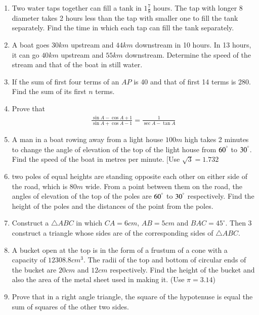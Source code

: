 \documentclass[12pt,-letter paper]{article}
\begin{document}
\begin{enumerate}
\item Two water taps together can fill a tank in $1\frac{7}{8}$
hours. The tap with longer 8 diameter takes 2 hours less than the tap with smaller one to fill the tank separately. Find the time in which each tap can fill the tank separately.
\item A boat goes $30 km$ upstream and $44 km$ downstream in 10 hours. In 13 hours, it can go $40 km$ upstream and $55 km$ downstream. Determine the speed of the stream and that of the boat in still water.
\item If the sum of first four terms of an $AP$ is 40 and that of first 14 terms is 280. Find the sum of its first $n$ terms.
\item Prove that \begin{align*} \frac{\sin A-\cos A+1}{\sin A+ \cos A-1}  =\frac{1}{\sec A-\tan A}\end{align*}
\item A man in a boat rowing away from a light house $100 m$ high takes 2 minutes to change the angle of elevation of the top of the light house from $60^\degree$ to $30^\degree$. Find the speed of the boat in metres per minute. [Use $\sqrt{3}=1.732$
\item two poles of equal heights are standing opposite each other on either side of the road, which is $80 m$ wide. From a point between them on the road, the angles of elevation of the top of the poles are $60^\degree$ to $30^\degree$ respectively. Find the height of the poles and the distances of the point from the poles.
\item Construct a $\triangle ABC$ in which $CA = 6 cm$, $AB = 5 cm$ and $BAC= 45^\circ$. Then 3 construct a triangle whose sides are of the corresponding sides of $\triangle ABC$.
\item A bucket open at the top is in the form of a frustum of a cone with a capacity of $12308.8 cm^3$. The radii of the top and bottom of circular ends of the bucket are $20 cm$ and $12 cm$ respectively. Find the height of the bucket and also the area of the metal sheet used in making it. (Use  $\pi= 3.14$)
\item Prove that in a right angle triangle, the square of the hypotenuse is equal the sum of squares of the other two sides.

\end{enumerate}
\end{document}

